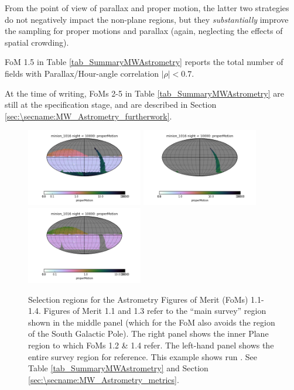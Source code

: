 From the point of view of parallax and proper motion, the latter two
strategies do not negatively impact the non-plane regions, but they
{\it substantially} improve the sampling for proper motions and
parallax (again, neglecting the effects of spatial crowding).

FoM 1.5 in Table \ref{tab_SummaryMWAstrometry} reports the total number of fields with Parallax/Hour-angle correlation $|\rho| < 0.7$.

At the time of writing, FoMs 2-5 in Table
\ref{tab_SummaryMWAstrometry} are still at the specification stage,
and are described in Section
\ref{sec:\secname:MW_Astrometry_furtherwork}.


\begin{figure}[h]
  \begin{center}
    \includegraphics[width=2.0in]{./figs/milkyway/astromPanels/MW_Astrom_FoM_properMotion_minion_1016_all_skymap.png}
  \includegraphics[width=2.0in]{./figs/milkyway/astromPanels/MW_Astrom_FoM_properMotion_minion_1016_plane_skymap.png}
  \includegraphics[width=2.0in]{./figs/milkyway/astromPanels/MW_Astrom_FoM_properMotion_minion_1016_nonPlane_skymap.png}
    \end{center}
  \caption{Selection regions for the Astrometry Figures of Merit (FoMs) 1.1-1.4. Figures of Merit 1.1 and 1.3 refer to the ``main survey'' region shown in the middle panel (which for the FoM also avoids the region of the South Galactic Pole). The right panel shows the inner Plane region to which FoMs 1.2 \& 1.4 refer. The left-hand panel shows the entire survey region for reference. This example shows run . See Table \ref{tab_SummaryMWAstrometry} and Section \ref{sec:\secname:MW_Astrometry_metrics}.}
  \label{fig_astrom_RegionSelKey}
\end{figure}

